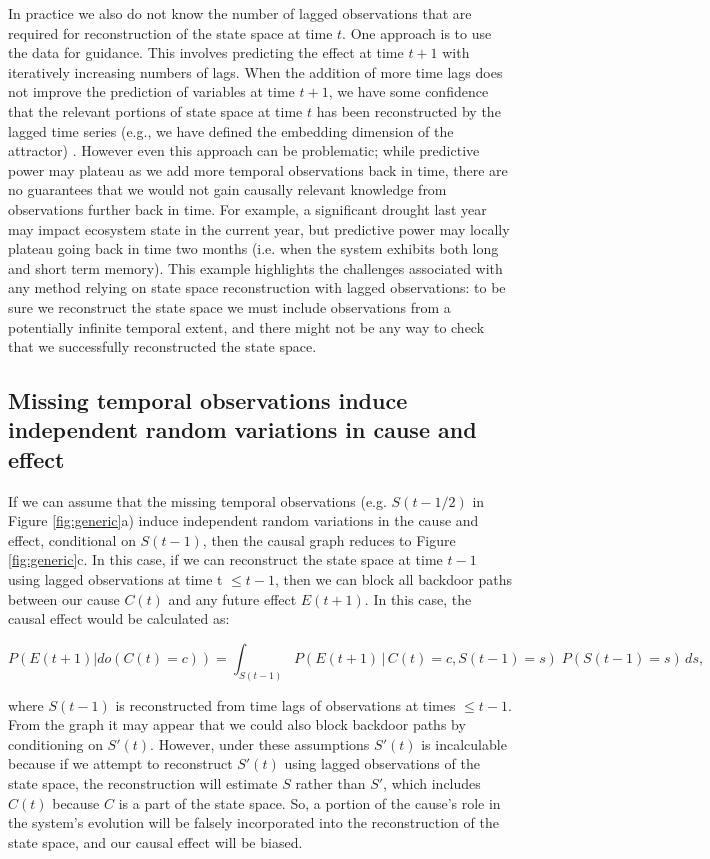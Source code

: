 \documentclass[12pt]{article}
\begin{document}
In practice we also do not know the number of lagged observations that
are required for reconstruction of the state space at time $t$. One
approach is to use the data for guidance. This involves predicting the
effect at time $t+1$ with iteratively increasing numbers of lags. When
the addition of more time lags does not improve the prediction of
variables at time $t+1$, we have some confidence that the relevant
portions of state space at time $t$ has been reconstructed by the
lagged time series (e.g., we have defined the embedding dimension of
the attractor) \citep{Sugihara496}. However even this approach can be
problematic; while predictive power may plateau as we add more
temporal observations back in time, there are no guarantees that we
would not gain causally relevant knowledge from observations further
back in time. For example, a significant drought last year may impact
ecosystem state in the current year, but predictive power may locally
plateau going back in time two months (i.e. when the system exhibits
both long and short term memory). This example highlights the
challenges associated with any method relying on state space
reconstruction with lagged observations: to be sure we reconstruct the
state space we must include observations from a potentially infinite
temporal extent, and there might not be any way to check that we
successfully reconstructed the state space.

\subsection{Missing temporal observations induce independent random
  variations in cause and effect}
\label{sec:miss-temp-observ}

If we can assume that the missing temporal observations
(e.g. $S(t-1/2)$ in Figure \ref{fig:generic}a) induce independent
random variations in the cause and effect, conditional on $S(t-1)$,
then the causal graph reduces to Figure \ref{fig:generic}c. In this
case, if we can reconstruct the state space at time $t-1$ using lagged
observations at time t $\leq t-1$, then we can block all backdoor
paths between our cause $C(t)$ and any future effect $E(t+1)$. In this
case, the causal effect would be calculated as:

\begin{equation}
  P(E(t+1)| do(C(t)=c)) = \int_{S(t-1)} P(E(t+1) \, | \, C(t)=c,
  S(t-1) = s
  )\; P(S(t-1)=s) \, d s,
\end{equation}

where $S(t-1)$ is reconstructed from time lags of observations at
times $\leq t-1$. From the graph it may appear that we could also
block backdoor paths by conditioning on $S'(t)$. However, under these
assumptions $S'(t)$ is incalculable because if we attempt to
reconstruct $S'(t)$ using lagged observations of the state space, the
reconstruction will estimate $S$ rather than $S'$, which includes
$C(t)$ because $C$ is a part of the state space. So, a portion of the
cause's role in the system's evolution will be falsely incorporated
into the reconstruction of the state space, and our causal effect will
be biased.
\end{document}
